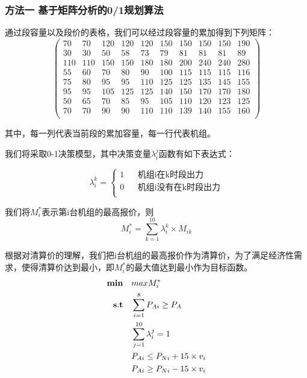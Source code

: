 \documentclass[12pt,a4paper]{ctexart}
\begin{document}
	\subsubsection*{方法一 \space  基于矩阵分析的0/1规划算法}
	通过段容量以及段价的表格，我们可以经过段容量的累加得到下列矩阵：
	\begin{equation}       
	\left(                 
	\begin{array}{cccccccccc}
	70&70& 120 & 120 &120&150&150&150&150&190 \\
	30&30 &50 &58 &73&79 &81&81&81&89\\
	110&110 &150 &150  &180&180&200&240&240&280  \\
	55&60 & 70& 80  &90&100&115&115&115&116\\
	75&80 &95& 95  & 110&125&125&135&145&155\\
	95&95&105&125&125&140&150&170&170&180\\
	50&65&70&85&95&105&110&120&123&125\\
	70&70&90&90&110&110&139&140&155&160\\
	\end{array}
	\right)                 
	\end{equation}

	其中，每一列代表当前段的累加容量，每一行代表机组。
	
	 我们将采取0-1决策模型，其中决策变量$\lambda_{i}^{j}$函数有如下表达式：
	
	$$ \lambda_{i}^{k}=\left\{
	\begin{array}{rcl}
		1       &      & {\text{机组i在k时段出力}}\\
		0       &      & {\text{机组i没有在k时段出力}}\\
	\end{array} \right. $$
	
	我们将$M_{i}^{*}$表示第i台机组的最高报价，则
	\begin{equation}
		M_{i}^{*}=\sum_{k=1}^{10} \lambda_{i}^{k} \times M_{ik} 
	\end{equation}
	
	根据对清算价的理解，我们把i台机组的最高报价作为清算价，为了满足经济性需求，使得清算价达到最小，即$M_{i}^{*}$的最大值达到最小作为目标函数。
	\begin{equation*}
		\begin{split}
			{\bf min}\quad & max M_{i}^{*}\\
			{\bf s.t}\quad &\sum_{i=1}^{8}P_{Ai} \ge P_{A}\\
			&\sum_{j=1}^{10} \lambda_{i}^{j} =1\\
			&P_{Ai} \le P_{Ni} + 15\times v_{i} \\
			&P_{Ai} \ge P_{Ni} - 15\times v_{i} \\
		\end{split}
	\end{equation*}
	
\end{document}
